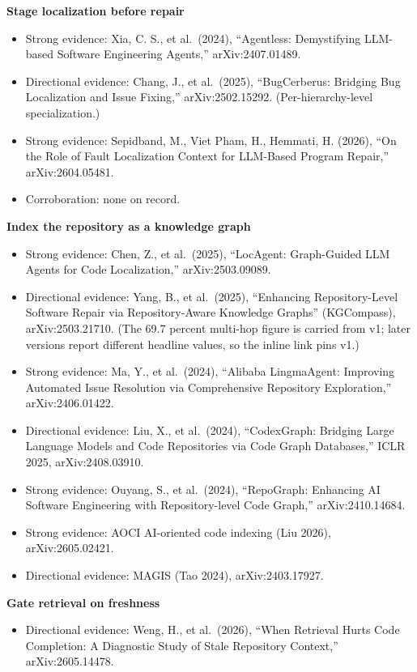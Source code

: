\textbf{Stage localization before repair}

\begin{itemize}
\tightlist
\item
  Strong evidence: Xia, C. S., et al.~(2024), ``Agentless: Demystifying LLM-based Software Engineering Agents,'' arXiv:2407.01489.
\item
  Directional evidence: Chang, J., et al.~(2025), ``BugCerberus: Bridging Bug Localization and Issue Fixing,'' arXiv:2502.15292. (Per-hierarchy-level specialization.)
\item
  Strong evidence: Sepidband, M., Viet Pham, H., Hemmati, H. (2026), ``On the Role of Fault Localization Context for LLM-Based Program Repair,'' arXiv:2604.05481.
\item
  Corroboration: none on record.
\end{itemize}

\textbf{Index the repository as a knowledge graph}

\begin{itemize}
\tightlist
\item
  Strong evidence: Chen, Z., et al.~(2025), ``LocAgent: Graph-Guided LLM Agents for Code Localization,'' arXiv:2503.09089.
\item
  Directional evidence: Yang, B., et al.~(2025), ``Enhancing Repository-Level Software Repair via Repository-Aware Knowledge Graphs'' (KGCompass), arXiv:2503.21710. (The 69.7 percent multi-hop figure is carried from v1; later versions report different headline values, so the inline link pins v1.)
\item
  Strong evidence: Ma, Y., et al.~(2024), ``Alibaba LingmaAgent: Improving Automated Issue Resolution via Comprehensive Repository Exploration,'' arXiv:2406.01422.
\item
  Directional evidence: Liu, X., et al.~(2024), ``CodexGraph: Bridging Large Language Models and Code Repositories via Code Graph Databases,'' ICLR 2025, arXiv:2408.03910.
\item
  Strong evidence: Ouyang, S., et al.~(2024), ``RepoGraph: Enhancing AI Software Engineering with Repository-level Code Graph,'' arXiv:2410.14684.
\item
  Strong evidence: AOCI AI-oriented code indexing (Liu 2026), arXiv:2605.02421.
\item
  Directional evidence: MAGIS (Tao 2024), arXiv:2403.17927.
\end{itemize}

\textbf{Gate retrieval on freshness}

\begin{itemize}
\tightlist
\item
  Directional evidence: Weng, H., et al.~(2026), ``When Retrieval Hurts Code Completion: A Diagnostic Study of Stale Repository Context,'' arXiv:2605.14478.
\end{itemize}
